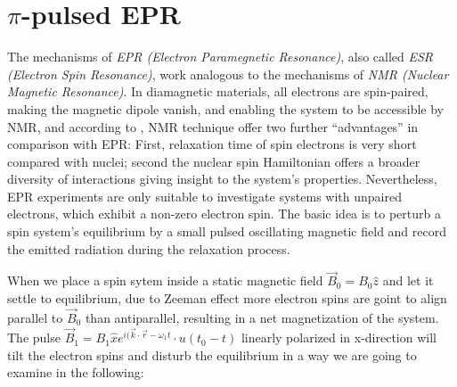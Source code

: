 \documentclass[11.5pt,a4paper]{article}
\begin{document}
\section{$\pi$-pulsed EPR}
The mechanisms of \emph{EPR (Electron Paramegnetic Resonance)}, also called \emph{ESR (Electron Spin Resonance)}, work analogous to the mechanisms of \emph{NMR (Nuclear Magnetic Resonance)}. In diamagnetic materials, all electrons are spin-paired, making the magnetic dipole vanish, and enabling the system to be accessible by NMR, and according to \cite[Chap. 4, p. 107]{nmr-ox}, NMR technique offer two further ``advantages'' in comparison with EPR: First, relaxation time of spin electrons is very short compared with nuclei; second the nuclear spin Hamiltonian offers a broader diversity of interactions giving insight to the system's properties. Nevertheless, EPR experiments are only suitable to investigate systems with unpaired electrons, which exhibit a non-zero electron spin. The basic idea is to perturb a spin system's equilibrium by a small pulsed oscillating magnetic field and record the emitted radiation during the relaxation process. 

When we place a spin sytem inside a static magnetic field $\vec{B}_0 = B_0 \hat{z}$ and let it settle to equilibrium, due to Zeeman effect more electron spins are goint to align parallel to $\vec{B}_0$ than antiparallel, resulting in a net magnetization of the system. The pulse $\vec{B}_1 = B_1 \hat{x} e^{i(\vec{k}\cdot\vec{r}-\omega_1 t} \cdot u(t_0-t)$ linearly polarized in x-direction will tilt the electron spins and disturb the equilibrium in a way we are going to examine in the following:
\end{document}
